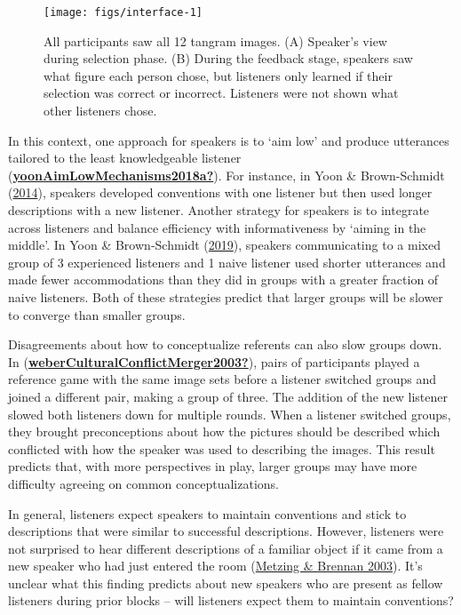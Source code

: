 \documentclass[
  english,
  a4paper,
]{article}
\begin{document}
\begin{figure*}[t!]

{\centering \texttt{[image: figs/interface-1]} 

}

\caption{All participants saw all 12 tangram images. (A) Speaker's view during selection phase. (B) During the feedback stage, speakers saw what figure each person chose, but listeners only learned if their selection was correct or incorrect. Listeners were not shown what other listeners chose. \label{game}}\label{fig:interface}
\end{figure*}

In this context, one approach for speakers is to `aim low' and produce utterances tailored to the least knowledgeable listener (\protect\hyperlink{ref-yoonAimLowMechanisms2018a}{\textbf{yoonAimLowMechanisms2018a?}}). For instance, in Yoon \& Brown-Schmidt (\protect\hyperlink{ref-yoonAdjustingConceptualPacts2014}{2014}), speakers developed conventions with one listener but then used longer descriptions with a new listener. Another strategy for speakers is to integrate across listeners and balance efficiency with informativeness by `aiming in the middle'. In Yoon \& Brown‐Schmidt (\protect\hyperlink{ref-yoonAudienceDesignMultiparty2019}{2019}), speakers communicating to a mixed group of 3 experienced listeners and 1 naive listener used shorter utterances and made fewer accommodations than they did in groups with a greater fraction of naive listeners. Both of these strategies predict that larger groups will be slower to converge than smaller groups.

Disagreements about how to conceptualize referents can also slow groups down. In (\protect\hyperlink{ref-weberCulturalConflictMerger2003}{\textbf{weberCulturalConflictMerger2003?}}), pairs of participants played a reference game with the same image sets before a listener switched groups and joined a different pair, making a group of three. The addition of the new listener slowed both listeners down for multiple rounds. When a listener switched groups, they brought preconceptions about how the pictures should be described which conflicted with how the speaker was used to describing the images. This result predicts that, with more perspectives in play, larger groups may have more difficulty agreeing on common conceptualizations.

In general, listeners expect speakers to maintain conventions and stick to descriptions that were similar to successful descriptions. However, listeners were not surprised to hear different descriptions of a familiar object if it came from a new speaker who had just entered the room (\protect\hyperlink{ref-metzingWhenConceptualPacts2003}{Metzing \& Brennan 2003}). It's unclear what this finding predicts about new speakers who are present as fellow listeners during prior blocks -- will listeners expect them to maintain conventions?
\end{document}
